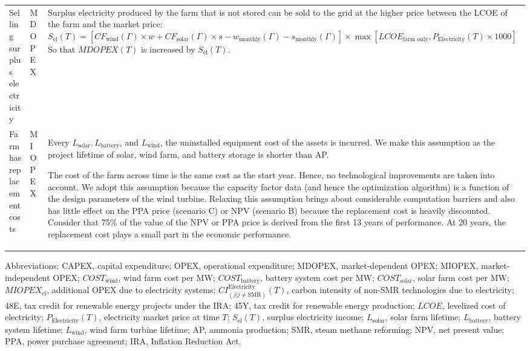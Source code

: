 \documentclass{article}
\begin{document}
\begin{table}[H]
\begin{tabular}{@{}lp{2cm}p{10cm}@{}}
    Selling surplus electricity & MDOPEX & Surplus electricity produced by the farm that is not stored can be sold to the grid at the higher price between the LCOE of the farm and the market price:
    \newline $S_{\text{el}}(T) = \left[CF_{\text{wind}}(\Gamma) \times w + CF_{\text{solar}}(\Gamma) \times s - w_{\text{monthly}}(\Gamma) - s_{\text{monthly}}(\Gamma)\right] \times \max[LCOE_{\text{farm only}}, P_{\text{Electricity}}(T) \times 1000]$
    \newline So that $MDOPEX(T)$ is increased by $S_{\text{el}}(T)$. \\
    Farm has replacement costs & MIOPEX & Every $L_{\text{solar}}, L_{\text{battery}}$, and $L_{\text{wind}}$, the uninstalled equipment cost of the assets is incurred. We make this assumption as the project lifetime of solar, wind farm, and battery storage is shorter than AP.
    
    The cost of the farm across time is the same cost as the start year. Hence, no technological improvements are taken into account. We adopt this assumption because the capacity factor data (and hence the optimization algorithm) is a function of the design parameters of the wind turbine. Relaxing this assumption brings about considerable computation barriers and also has little effect on the PPA price (scenario C) or NPV (scenario B) because the replacement cost is heavily discounted. Consider that 75\% of the value of the NPV or PPA price is derived from the first 13 years of performance. At 20 years, the replacement cost plays a small part in the economic performance.  
    \\ \bottomrule
  \end{tabular}
  \begin{tablenotes}
  \small
  \item Abbreviations: CAPEX, capital expenditure; OPEX, operational expenditure; MDOPEX, market-dependent OPEX; MIOPEX, market-independent OPEX; $COST_{\text{wind}}$, wind farm cost per MW; $COST_{\text{battery}}$, battery system cost per MW; $COST_{\text{solar}}$, solar farm cost per MW; $MIOPEX_{\text{el}}$, additional OPEX due to electricity systems; $CI_{(j | j \neq \text{SMR})}^{\text{Electricity}}(T)$, carbon intensity of non-SMR technologies due to electricity; 48E, tax credit for renewable energy projects under the IRA; 45Y, tax credit for renewable energy production; $LCOE$, levelized cost of electricity; $P_{\text{Electricity}}(T)$, electricity market price at time $T$; $S_{\text{el}}(T)$, surplus electricity income; $L_{\text{solar}}$, solar farm lifetime; $L_{\text{battery}}$, battery system lifetime; $L_{\text{wind}}$, wind farm turbine lifetime; AP, ammonia production; SMR, steam methane reforming; NPV, net present value; PPA, power purchase agreement; IRA, Inflation Reduction Act.
\end{tablenotes}

\end{table}
\end{document}
